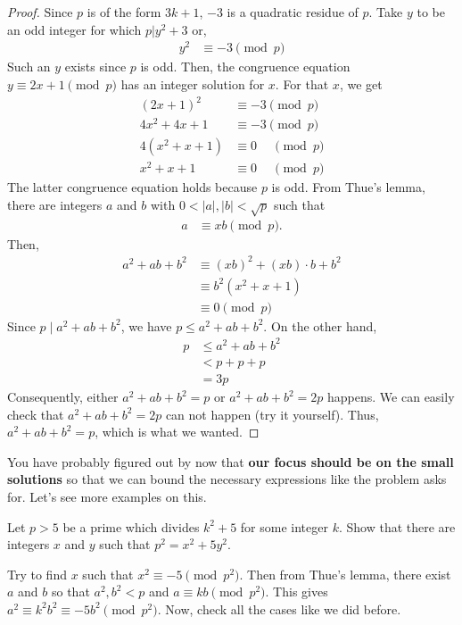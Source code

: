 \begin{proof}
	Since $p$ is of the form $3k+1$, $-3$ is a quadratic residue of $p$. Take $y$ to be an odd integer for which $p|y^2+3$ or,
		\begin{align*}
			y^2 & \equiv-3\pmod p
		\end{align*}
	Such an $y$ exists since $p$ is odd. Then, the congruence equation $y\equiv2x+1\pmod p$ has an integer solution for $x$. For that $x$, we get
		\begin{align*}
			(2x+1)^2 & \equiv-3\pmod p\\
			4x^2+4x+1& \equiv-3\pmod p\\
			4(x^2+x+1)&\equiv 0 \phantom{-}\pmod p\\
			x^2+x+1	 & \equiv 0 \phantom{-}\pmod p
		\end{align*}
	The latter congruence equation holds because $p$ is odd. From Thue's lemma, there are integers $a$ and $b$ with $0<|a|,|b|< \sqrt p$ such that
		\begin{align*}
			a & \equiv xb\pmod p.
		\end{align*}
	Then,
		\begin{align*}
			a^2+ab+b^2  & \equiv (xb)^2+(xb)\cdot b+b^2\\
			& \equiv b^2(x^2+x+1)\\
			& \equiv 0\pmod p
		\end{align*}
	Since $p\mid a^2+ab+b^2$, we have $p\leq a^2+ab+b^2$. On the other hand,
		\begin{align*}
			p& \leq a^2+ab+b^2 \\
			& < p+p+p \\
			&= 3p
		\end{align*}
	Consequently, either $a^2+ab+b^2=p$ or $a^2+ab+b^2=2p$ happens. We can easily check that $a^2+ab+b^2=2p$ can not happen (try it yourself). Thus, $a^2+ab+b^2=p$, which is what we wanted.
\end{proof}

You have probably figured out by now that \textbf{our focus should be on the small solutions} so that we can bound the necessary expressions like the problem asks for. Let's see more examples on this.

\begin{theorem}
	Let $p>5$ be a prime which divides $k^2+5$ for some integer $k$. Show that there are integers $x$ and $y$ such that $p^2=x^2+5y^2$.
\end{theorem}

\begin{hint}
	Try to find $x$ such that $x^2\equiv-5\pmod{p^2}$. Then from Thue's lemma, there exist $a$ and $b$ so that $a^2,b^2<p$ and $a\equiv kb\pmod{p^2}$. This gives $a^2\equiv k^2b^2\equiv-5b^2\pmod{p^2}$. Now, check all the cases like we did before.
\end{hint}


